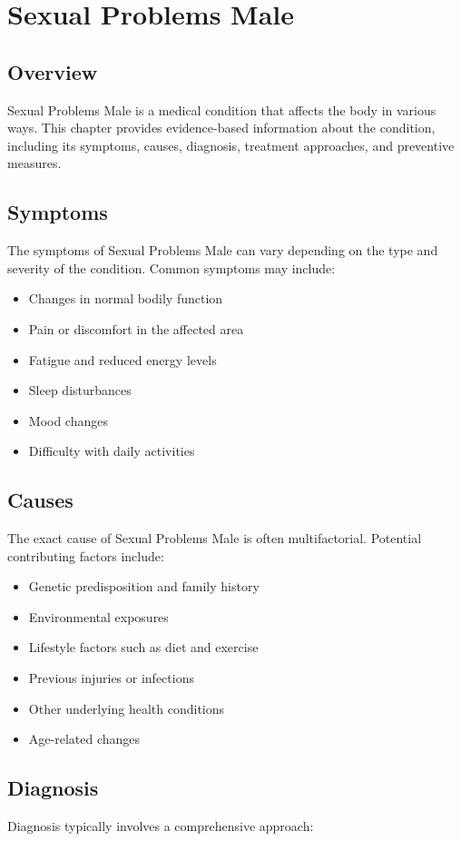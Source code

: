 \chapter{Sexual Problems Male}

\section*{Overview}
Sexual Problems Male is a medical condition that affects the body in various ways. This chapter provides evidence-based information about the condition, including its symptoms, causes, diagnosis, treatment approaches, and preventive measures.

\section*{Symptoms}
The symptoms of Sexual Problems Male can vary depending on the type and severity of the condition. Common symptoms may include:

\begin{itemize}
\item Changes in normal bodily function
\item Pain or discomfort in the affected area
\item Fatigue and reduced energy levels
\item Sleep disturbances
\item Mood changes
\item Difficulty with daily activities
\end{itemize}

\section*{Causes}
The exact cause of Sexual Problems Male is often multifactorial. Potential contributing factors include:

\begin{itemize}
\item Genetic predisposition and family history
\item Environmental exposures
\item Lifestyle factors such as diet and exercise
\item Previous injuries or infections
\item Other underlying health conditions
\item Age-related changes
\end{itemize}

\section*{Diagnosis}
Diagnosis typically involves a comprehensive approach:

